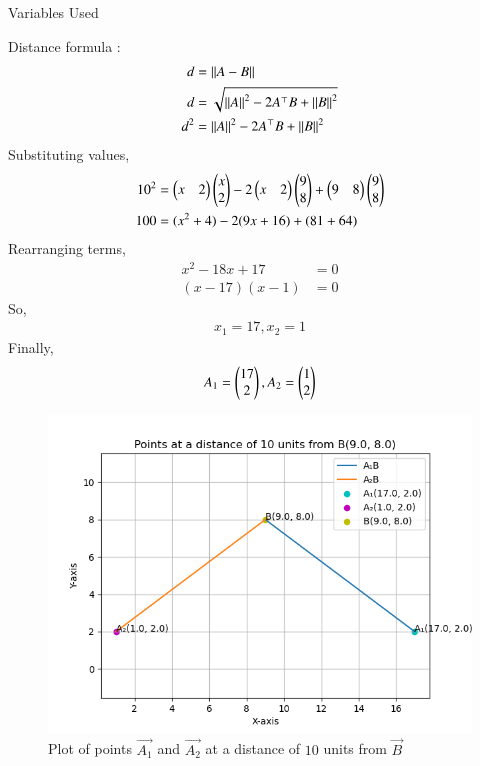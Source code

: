 \documentclass[journal]{IEEEtran}
\begin{document}
\solution
\begin{table}[h!]    
  \centering
  
  \caption{Variables Used}
  \label{tab1.9.19.1}
\end{table}
Distance formula :
\begin{align}
	d&=\left\lVert A-B\right\rVert \\
	d&=\sqrt{\left\lVert A\right\rVert^2-2A^\top B+\left\lVert B\right\rVert^2} \\
	d^2&=\left\lVert A\right\rVert^2-2A^\top B+\left\lVert B\right\rVert^2
\end{align}
Substituting values,
\begin{align}
	10^2&=\begin{pmatrix}x&2\end{pmatrix}\begin{pmatrix}x\\2\end{pmatrix}-2\begin{pmatrix}x&2\end{pmatrix}\begin{pmatrix}9\\8\end{pmatrix}+\begin{pmatrix}9&8\end{pmatrix}\begin{pmatrix}9\\8\end{pmatrix} \\
	100&=(x^2+4)-2(9x+16)+(81+64)
\end{align}
Rearranging terms,
\begin{align}
	x^2-18x+17&=0 \\
	(x-17)(x-1)&=0
\end{align}
So,
\begin{align}
	x_1=17, x_2=1
\end{align}
Finally,
\begin{align}
	A_1=\begin{pmatrix}17\\2\end{pmatrix}, A_2=\begin{pmatrix}1\\2\end{pmatrix}
\end{align}
\begin{figure}[ht!]
	\centering
   	\includegraphics[width=0.8\linewidth]{figs/plot.png}
   	\caption{Plot of points $\vec{A_1}$ and $\vec{A_2}$ at a distance of $10$ units from $\vec{B}$}
\label{Plot}
\end{figure}
\end{document}
